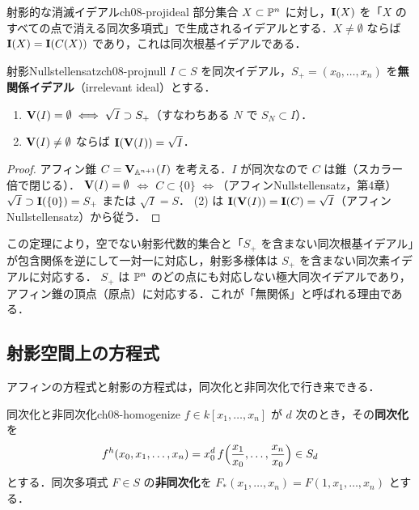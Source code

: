 \begin{mydef}{射影的な消滅イデアル}{ch08-projideal}
部分集合 $X\subset\mathbb{P}^n$ に対し，$\mathbf{I}(X)$ を「$X$ のすべての点で消える同次多項式」で生成されるイデアルとする．$X\neq\emptyset$ ならば $\mathbf{I}(X)=\mathbf{I}(C(X))$ であり，これは同次根基イデアルである．
\end{mydef}

\begin{mythm}{射影Nullstellensatz}{ch08-projnull}
$I\subset S$ を同次イデアル，$S_+=(x_0,\dots,x_n)$ を\textbf{無関係イデアル}（irrelevant ideal）とする．
\begin{enumerate}
  \item $\mathbf{V}(I)=\emptyset\iff\sqrt I\supset S_+$（すなわちある $N$ で $S_N\subset I$）．
  \item $\mathbf{V}(I)\neq\emptyset$ ならば $\mathbf{I}(\mathbf{V}(I))=\sqrt I$．
\end{enumerate}
\end{mythm}

\begin{proof}
アフィン錐 $C=\mathbf{V}_{\mathbb{A}^{n+1}}(I)$ を考える．$I$ が同次なので $C$ は錐（スカラー倍で閉じる）．
$\mathbf{V}(I)=\emptyset$ $\iff$ $C\subset\{0\}$ $\iff$（アフィンNullstellensatz，第4章）$\sqrt I\supset\mathbf{I}(\{0\})=S_+$ または $\sqrt I=S$．
(2) は $\mathbf{I}(\mathbf{V}(I))=\mathbf{I}(C)=\sqrt I$（アフィンNullstellensatz）から従う．
\end{proof}

この定理により，空でない射影代数的集合と「$S_+$ を含まない同次根基イデアル」が包含関係を逆にして一対一に対応し，射影多様体は $S_+$ を含まない同次素イデアルに対応する．
$S_+$ は $\mathbb{P}^n$ のどの点にも対応しない極大同次イデアルであり，アフィン錐の頂点（原点）に対応する．これが「無関係」と呼ばれる理由である．

\subsection{射影空間上の方程式}

アフィンの方程式と射影の方程式は，同次化と非同次化で行き来できる．

\begin{mydef}{同次化と非同次化}{ch08-homogenize}
$f\in k[x_1,\dots,x_n]$ が $d$ 次のとき，その\textbf{同次化}を
\[
  f^h(x_0,x_1,\dots,x_n)=x_0^d\,f\Bigl(\frac{x_1}{x_0},\dots,\frac{x_n}{x_0}\Bigr)\in S_d
\]
とする．同次多項式 $F\in S$ の\textbf{非同次化}を $F_*(x_1,\dots,x_n)=F(1,x_1,\dots,x_n)$ とする．
\end{mydef}

